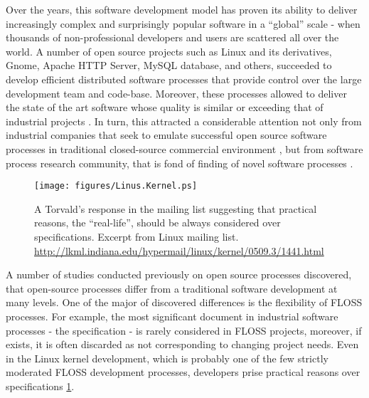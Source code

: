 Over the years, this software development model has proven its ability to deliver increasingly complex 
and surprisingly popular software in a ``global'' scale - when thousands of non-professional developers 
and users are scattered all over the world. A number of open source projects such as Linux and its 
derivatives, Gnome, Apache HTTP Server, MySQL database, and others, succeeded to develop efficient 
distributed software processes that provide control over the large development team and code-base.
Moreover, these processes allowed to deliver the state of the art software whose quality is similar 
or exceeding that of industrial projects \cite{coverity2012}. 
In turn, this attracted a considerable attention not only from industrial companies that seek to emulate 
successful open source software processes in traditional closed-source commercial environment 
\cite{oss_virtual_organizations} \cite{oss_balance} \cite{oss_hp} \cite{oss_4industry}, 
but from software process research community, that is fond of finding of novel software processes
\cite{citeulike:12550640} \cite{citeulike:5043664} \cite{citeulike:5128808} \cite{citeulike:10377366}.

\begin{figure}[ht!]
   \centering
   \texttt{[image: figures/Linus.Kernel.ps]}
   \caption{A Torvald's response in the mailing list suggesting that practical reasons, the ``real-life'', 
   should be always considered over specifications.
   Excerpt from Linux mailing list. \url{http://lkml.indiana.edu/hypermail/linux/kernel/0509.3/1441.html}}
   \label{fig:kernel}
\end{figure}

A number of studies conducted previously on open source processes discovered, that open-source processes 
differ from a traditional software development at many levels. One of the major of discovered differences 
is the flexibility of FLOSS processes. For example, the most significant document in industrial software 
processes - the specification - is rarely considered in FLOSS projects, moreover, if exists, it is often 
discarded as not corresponding to changing project needs. Even in the Linux kernel development, which is 
probably one of the few strictly moderated FLOSS development processes, developers prise practical reasons 
over specifications \ref{fig:kernel}.

